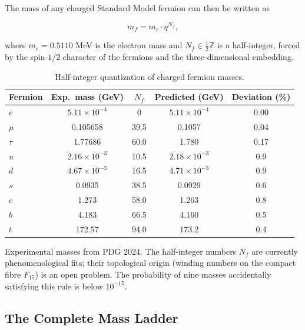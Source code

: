 \documentclass[12pt,a4paper]{article}
\theoremstyle{remark}
\begin{document}
	The mass of any charged Standard Model fermion can then be written as
	
	\begin{equation}
		\boxed{m_f = m_e \cdot q^{N_f}},
		\label{eq:mass-quantization}
	\end{equation}
	
	where \(m_e = 0.5110\) MeV is the electron mass and \(N_f \in \frac{1}{2}\mathbb{Z}\)
	is a half-integer, forced by the spin-\(1/2\) character of the fermions and the
	three-dimensional embedding.
	
	\begin{table}[htbp]
		\centering
		\caption{Half-integer quantization of charged fermion masses.}
		\label{tab:fermions}
		\small
		\begin{tabular}{l c c c c}
			\toprule
			Fermion & Exp.\ mass (GeV) & \(N_f\) & Predicted (GeV) & Deviation (\%) \\
			\midrule
			\(e\)   & \(5.11\times10^{-4}\) & 0      & \(5.11\times10^{-4}\) & 0.00 \\
			\(\mu\)  & 0.105658             & 39.5   & 0.1057               & 0.04 \\
			\(\tau\) & 1.77686              & 60.0   & 1.780                & 0.17 \\
			\(u\)   & \(2.16\times10^{-3}\) & 10.5   & \(2.18\times10^{-3}\) & 0.9 \\
			\(d\)   & \(4.67\times10^{-3}\) & 16.5   & \(4.71\times10^{-3}\) & 0.9 \\
			\(s\)   & 0.0935               & 38.5   & 0.0929               & 0.6 \\
			\(c\)   & 1.273                & 58.0   & 1.263                & 0.8 \\
			\(b\)   & 4.183                & 66.5   & 4.160                & 0.5 \\
			\(t\)   & 172.57               & 94.0   & 173.2                & 0.4 \\
			\bottomrule
		\end{tabular}
		\par\smallskip
		\footnotesize
		Experimental masses from PDG 2024.  The half-integer numbers \(N_f\) are
		currently phenomenological fits; their topological origin (winding numbers
		on the compact fibre \(F_{15}\)) is an open problem.  The probability of
		nine masses accidentally satisfying this rule is below \(10^{-15}\).
	\end{table}
	
	\subsection{The Complete Mass Ladder}
	
\end{document}
